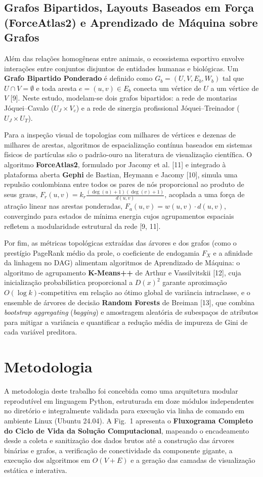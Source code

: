 \documentclass[conference]{IEEEtran}
\begin{document}
\subsection{Grafos Bipartidos, Layouts Baseados em Força (ForceAtlas2) e Aprendizado de Máquina sobre Grafos}
Além das relações homogêneas entre animais, o ecossistema esportivo envolve interações entre conjuntos disjuntos de entidades humanas e biológicas. Um \textbf{Grafo Bipartido Ponderado} é definido como $G_b = (U, V, E_b, W_b)$ tal que $U \cap V = \emptyset$ e toda aresta $e = (u, v) \in E_b$ conecta um vértice de $U$ a um vértice de $V$ [9]. Neste estudo, modelam-se dois grafos bipartidos: a rede de montarias Jóquei--Cavalo ($U_J \times V_c$) e a rede de sinergia profissional Jóquei--Treinador ($U_J \times U_T$).

Para a inspeção visual de topologias com milhares de vértices e dezenas de milhares de arestas, algoritmos de espacialização contínua baseados em sistemas físicos de partículas são o padrão-ouro na literatura de visualização científica. O algoritmo \textbf{ForceAtlas2}, formulado por Jacomy et al. [11] e integrado à plataforma aberta \textbf{Gephi} de Bastian, Heymann e Jacomy [10], simula uma repulsão coulombiana entre todos os pares de nós proporcional ao produto de seus graus, $F_r(u, v) = k_r \frac{(\deg(u)+1)(\deg(v)+1)}{d(u, v)}$, acoplada a uma força de atração linear nas arestas ponderadas, $F_a(u, v) = w(u, v) \cdot d(u, v)$, convergindo para estados de mínima energia cujos agrupamentos espaciais refletem a modularidade estrutural da rede [9, 11].

Por fim, as métricas topológicas extraídas das árvores e dos grafos (como o prestígio PageRank médio da prole, o coeficiente de endogamia $F_X$ e a afinidade da linhagem no DAG) alimentam algoritmos de Aprendizado de Máquina: o algoritmo de agrupamento \textbf{K-Means++} de Arthur e Vassilvitskii [12], cuja inicialização probabilística proporcional a $D(x)^2$ garante aproximação $O(\log k)$-competitiva em relação ao ótimo global de variância intraclasse, e o ensemble de árvores de decisão \textbf{Random Forests} de Breiman [13], que combina \textit{bootstrap aggregating} (\textit{bagging}) e amostragem aleatória de subespaços de atributos para mitigar a variância e quantificar a redução média de impureza de Gini de cada variável preditora.

\section{Metodologia}
A metodologia deste trabalho foi concebida como uma arquitetura modular reprodutível em linguagem Python, estruturada em doze módulos independentes no diretório  e integralmente validada para execução via linha de comando em ambiente Linux (Ubuntu 24.04). A Fig.~1 apresenta o \textbf{Fluxograma Completo do Ciclo de Vida da Solução Computacional}, mapeando o encadeamento desde a coleta e sanitização dos dados brutos até a construção das árvores binárias e grafos, a verificação de conectividade da componente gigante, a execução dos algoritmos em $O(V + E)$ e a geração das camadas de visualização estática e interativa.
\end{document}
